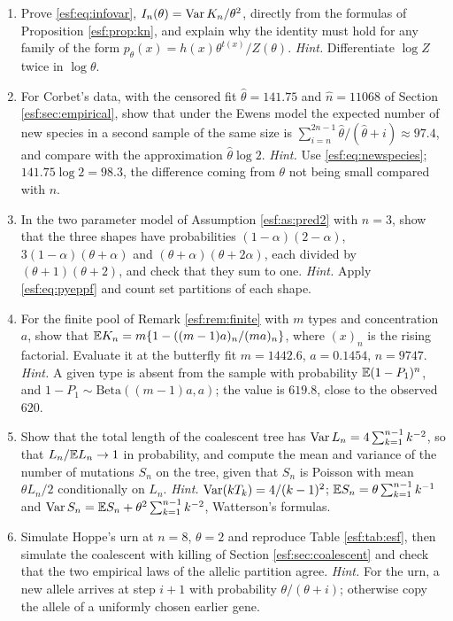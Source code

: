 \begin{enumerate}[label=\arabic*., leftmargin=*]
\item Prove \eqref{esf:eq:infovar}, $I_n(\theta) = \operatorname{Var} K_n/\theta^{2}$, directly from
the formulas of Proposition \ref{esf:prop:kn}, and explain why the identity must hold
for any family of the form $p_\theta(x) = h(x)\theta^{t(x)}/Z(\theta)$.
\emph{Hint.} Differentiate $\log Z$ twice in $\log\theta$.

\item For Corbet's data, with the censored fit $\hat\theta = 141.75$ and $\hat n = 11068$ of Section \ref{esf:sec:empirical}, show that under the Ewens model the
expected number of new species in a second sample of the same size is
$\sum_{i=n}^{2n-1} \hat\theta/(\hat\theta+i) \approx 97.4$, and compare with the
approximation $\hat\theta \log 2$.
\emph{Hint.} Use \eqref{esf:eq:newspecies}; $141.75 \log 2 = 98.3$, the difference
coming from $\theta$ not being small compared with $n$.

\item In the two parameter model of Assumption \ref{esf:as:pred2} with $n = 3$, show
that the three shapes have probabilities
$(1-\alpha)(2-\alpha)$, $3(1-\alpha)(\theta+\alpha)$ and $(\theta+\alpha)(\theta+2\alpha)$,
each divided by $(\theta+1)(\theta+2)$, and check that they sum to one.
\emph{Hint.} Apply \eqref{esf:eq:pyeppf} and count set partitions of each shape.

\item For the finite pool of Remark \ref{esf:rem:finite} with $m$ types and
concentration $a$, show that
$\mathbb{E} K_n = m\{1 - ((m-1)a)_{n}/(ma)_{n}\}$, where $(x)_n$ is the rising factorial.
Evaluate it at the butterfly fit $m = 1442.6$, $a = 0.1454$, $n = 9747$.
\emph{Hint.} A given type is absent from the sample with probability
$\mathbb{E}(1-P_1)^{n}$, and $1 - P_1 \sim \mathrm{Beta}((m-1)a, a)$; the value is $619.8$,
close to the observed $620$.

\item Show that the total length of the coalescent tree has
$\operatorname{Var} L_n = 4\sum_{k=1}^{n-1} k^{-2}$, so that $L_n/\mathbb{E} L_n \to 1$ in probability, and
compute the mean and variance of the number of mutations $S_n$ on the tree, given
that $S_n$ is Poisson with mean $\theta L_n/2$ conditionally on $L_n$.
\emph{Hint.} $\operatorname{Var}(kT_k) = 4/(k-1)^{2}$; $\mathbb{E} S_n = \theta\sum_{k=1}^{n-1} k^{-1}$ and
$\operatorname{Var} S_n = \mathbb{E} S_n + \theta^{2}\sum_{k=1}^{n-1}k^{-2}$, Watterson's formulas.

\item Simulate Hoppe's urn at $n = 8$, $\theta = 2$ and reproduce Table \ref{esf:tab:esf},
then simulate the coalescent with killing of Section \ref{esf:sec:coalescent} and
check that the two empirical laws of the allelic partition agree.
\emph{Hint.} For the urn, a new allele arrives at step $i+1$ with probability
$\theta/(\theta+i)$; otherwise copy the allele of a uniformly chosen earlier gene.

\end{enumerate}



